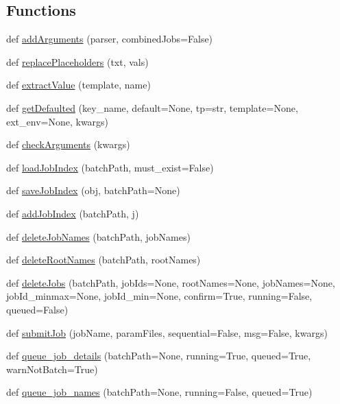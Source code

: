 \subsection*{Functions}
\begin{DoxyCompactItemize}
\item 
def \mbox{\hyperlink{namespaceparamgrid_1_1jobqueue_a4119e59674e8fdbc2bf79d63df03efeb}{add\+Arguments}} (parser, combined\+Jobs=False)
\item 
def \mbox{\hyperlink{namespaceparamgrid_1_1jobqueue_a031dc892bb06dea862e0cd66679abf85}{replace\+Placeholders}} (txt, vals)
\item 
def \mbox{\hyperlink{namespaceparamgrid_1_1jobqueue_a0735153d2189fa2f6e00c8d5fcb2a01f}{extract\+Value}} (template, name)
\item 
def \mbox{\hyperlink{namespaceparamgrid_1_1jobqueue_a46526092620bf46ab99b066c5c44d038}{get\+Defaulted}} (key\+\_\+name, default=None, tp=str, template=None, ext\+\_\+env=None, kwargs)
\item 
def \mbox{\hyperlink{namespaceparamgrid_1_1jobqueue_a8887b30e1e0ae144c205ce0bdbb10f70}{check\+Arguments}} (kwargs)
\item 
def \mbox{\hyperlink{namespaceparamgrid_1_1jobqueue_a29a41a32b0de4a0554ceeb588e81584c}{load\+Job\+Index}} (batch\+Path, must\+\_\+exist=False)
\item 
def \mbox{\hyperlink{namespaceparamgrid_1_1jobqueue_a691d4fd653c9cc544442a64a98f7d277}{save\+Job\+Index}} (obj, batch\+Path=None)
\item 
def \mbox{\hyperlink{namespaceparamgrid_1_1jobqueue_a52e2a5b1c164e5eb20746d45d7005621}{add\+Job\+Index}} (batch\+Path, \mbox{\hyperlink{plotcls_8m_ac86694252f8dfdb19aaeadc4b7c342c6}{j}})
\item 
def \mbox{\hyperlink{namespaceparamgrid_1_1jobqueue_a54698014c1d21493336e894bc3d8d7ed}{delete\+Job\+Names}} (batch\+Path, job\+Names)
\item 
def \mbox{\hyperlink{namespaceparamgrid_1_1jobqueue_a3c9cbe684a6be879c4a25253e6e9dafe}{delete\+Root\+Names}} (batch\+Path, root\+Names)
\item 
def \mbox{\hyperlink{namespaceparamgrid_1_1jobqueue_a6fbbd25249531a7a6197d5ffe37d164e}{delete\+Jobs}} (batch\+Path, job\+Ids=None, root\+Names=None, job\+Names=None, job\+Id\+\_\+minmax=None, job\+Id\+\_\+min=None, confirm=True, running=False, queued=False)
\item 
def \mbox{\hyperlink{namespaceparamgrid_1_1jobqueue_a50c5e49392f8b76bbe9c440187f9cfb5}{submit\+Job}} (job\+Name, param\+Files, sequential=False, msg=False, kwargs)
\item 
def \mbox{\hyperlink{namespaceparamgrid_1_1jobqueue_af4426f4a1bf4d4051e4c05f6627e9fef}{queue\+\_\+job\+\_\+details}} (batch\+Path=None, running=True, queued=True, warn\+Not\+Batch=True)
\item 
def \mbox{\hyperlink{namespaceparamgrid_1_1jobqueue_a6fab141ec4e778b457d8e3c3f0447037}{queue\+\_\+job\+\_\+names}} (batch\+Path=None, running=False, queued=True)
\end{DoxyCompactItemize}


